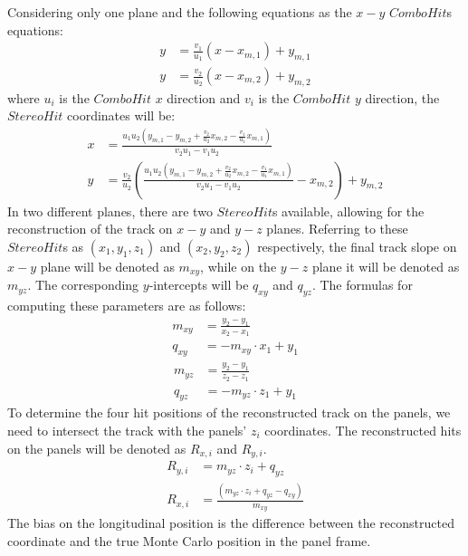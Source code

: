 Considering only one plane and the following equations as the $x-y$ $Combo Hit$s equations:
\begin{equation}
    \begin{aligned}
        y&=\frac{v_1}{u_1}(x-x_{m,1})+y_{m,1} \\
        y&=\frac{v_2}{u_2}(x-x_{m,2})+y_{m,2} 
    \end{aligned}
    \end{equation}
where $u_i$ is the $ComboHit$ $x$ direction and $v_i$ is the $ComboHit$ $y$ direction, the $StereoHit$ coordinates will be:
\begin{equation}\label{x}
    \begin{aligned}
x&=\frac{u_1 u_2(y_{m,1}-y_{m,2}+\frac{v_2}{u_2}x_{m,2}-\frac{v_1}{u_1}x_{m,1})}{v_2 u_1 - v_1 u_2}\\
y&=\frac{v_2}{u_2}\left(\frac{u_1 u_2(y_{m,1}-y_{m,2}+\frac{v_2}{u_2}x_{m,2}-\frac{v_1}{u_1}x_{m,1})}{v_2 u_1 - v_1 u_2}-x_{m,2}\right)+y_{m,2}
\end{aligned}
\end{equation}
In two different planes, there are two $StereoHit$s available, allowing for the reconstruction of the track on $x-y$ and $y-z$ planes. 
Referring to these $StereoHit$s as $(x_1,y_1,z_1)$ and $(x_2,y_2,z_2)$ respectively, the final track slope on $x-y$ plane will be 
denoted as $m_{xy}$, while on the $y-z$ plane it will be denoted as $m_{yz}$. The corresponding $y$-intercepts will be $q_{xy}$ and $q_{yz}$.
The formulas for computing these parameters are as follows:
\begin{equation}
    \begin{aligned}
m_{xy}&=\frac{y_2-y_1}{x_2-x_1}\\
q_{xy}&=-m_{xy} \cdot x_1+y_1
\end{aligned}
\end{equation}
\begin{equation}
    \begin{aligned}
m_{yz}&=\frac{y_2-y_1}{z_2-z_1}\\
q_{yz}&=-m_{yz} \cdot z_1+y_1
\end{aligned}
\end{equation}
To determine the four hit positions of the reconstructed track on the panels, we need to intersect the track with the panels' $z_i$ coordinates. 
The reconstructed hits on the panels will be denoted as $R_{x,i}$ and $R_{y,i}$.
\begin{equation}
    \begin{aligned}
 R_{y,i}&=m_{yz}\cdot z_i+q_{yz}\\
 R_{x,i}&=\frac{(m_{yz}\cdot z_i+q_{yz}-q_{xy})}{m_{xy}}
\end{aligned}
\end{equation}
The bias on the longitudinal position is the difference between the reconstructed coordinate and the true Monte Carlo position in the panel frame.

